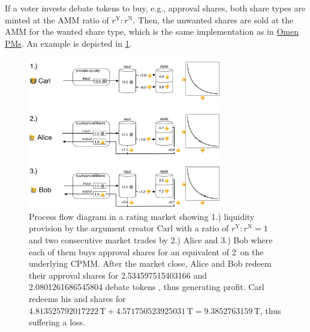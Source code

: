 \documentclass[%
aip,
amsmath,amssymb,
reprint,%
unsortedaddress,
nofootinbib
]{revtex4-2}
\newcommand{\T}{\text{T}}
\newcommand{\Y}{\text{Y}}
\newcommand{\N}{\text{N}}
\begin{document}
If a voter invests debate tokens to buy, e.g., approval shares,
both share types are minted at the  \ac{AMM} ratio of $r^\Y: r^\N$.
Then, the unwanted shares are sold at the \ac{AMM} for the wanted share type, 
which is the same implementation as in 
\href{https://omen.eth.link/}{Omen \acp{PM}}\cite{Omen2020}.
An example is depicted in \cref{fig:RatingMarket}.
\begin{figure}
	\includegraphics[width=0.75\textwidth]{Graphics/RatingMarket.pdf}
	\caption{Process flow diagram in a rating market showing
	1.) liquidity provision by the argument creator Carl with a ratio of $r^\Y:r^\N=1$
	and 
	two consecutive market trades by 
	2.) Alice and 
	3.) Bob where each of them buys approval shares for an equivalent of 2\,\T{} on the underlying \ac{CPMM}.
	After the market close, 
	Alice and Bob redeem their approval shares \Y{} for \num[round-mode=places,round-precision=1]{2.534597515403166}
	and
	\num[round-mode=places,round-precision=1]{2.0801261686545804}
	debate tokens \T{}, thus generating profit.
	Carl redeems his \Y{} and \N{} shares for
	$\num[round-mode=places,round-precision=1]{4.813525792017222}\,\T
	+\num[round-mode=places,round-precision=1]{4.571750523925031}\,\T
	=\num[round-mode=places,round-precision=1]{9.3852763159}\,\T$, thus suffering a loss.
}
	\label{fig:RatingMarket}
\end{figure}




\end{document}

